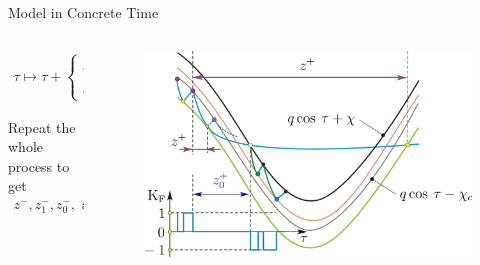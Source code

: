 \begin{frame}{Model in Concrete Time}
	\vspace{-1em}
	\begin{columns}
		\begin{column}{.5 \textwidth}
			\begin{align*}
				\tau \mapsto  \tau + \begin{cases}
					                     z^{+} + z_{1}^{+}     & \text{if } z^{+} \leq z_{0}^{+} \\
					                     z_{0}^{+} + z_{2}^{+} & \text{if } z^{+} > z_{0}^{+}
				                     \end{cases}
			\end{align*}
			\vspace{1em}

			Repeat the whole process to get
			\begin{align*}
				z^{-}, z_{1}^{-}, z_{0}^{-}, \text{ and } z_{2}^{-}
			\end{align*}
		\end{column}
		\begin{column}{.5 \textwidth}
			\begin{figure}
				\includegraphics[width=1 \textwidth]{Figs/discrete_model_derivation_cases.png}
			\end{figure}
		\end{column}
	\end{columns}

	\flushright{[Avrutin]}
\end{frame}

